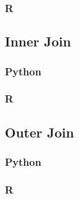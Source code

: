 \documentclass[
]{book}
\begin{document}
\hypertarget{r-28}{%
\subsubsection*{R}\label{r-28}}

\hypertarget{inner-join}{%
\subsection{Inner Join}\label{inner-join}}

\hypertarget{python-29}{%
\subsubsection*{Python}\label{python-29}}

\hypertarget{r-29}{%
\subsubsection*{R}\label{r-29}}

\hypertarget{outer-join}{%
\subsection{Outer Join}\label{outer-join}}

\hypertarget{python-30}{%
\subsubsection*{Python}\label{python-30}}

\hypertarget{r-30}{%
\subsubsection*{R}\label{r-30}}

  
\end{document}

